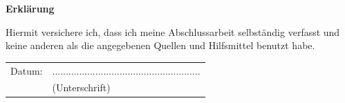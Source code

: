 \documentclass[12pt,a4paper,bibliography=totocnumbered,listof=totocnumbered]{scrartcl}
\begin{document}
\newpage
\thispagestyle{empty}
\begin{center}
	\vspace*{5em}
	\huge\textbf{Erklärung}\\
\end{center}
\vspace{2em}
Hiermit versichere ich, dass ich meine Abschlussarbeit selbständig verfasst und keine anderen als die angegebenen Quellen und Hilfsmittel benutzt habe.

\vspace{4em}
\begin{minipage}{\linewidth}
	\begin{tabular}{p{15em}p{15em}}
		Datum: &  .......................................................\\
		& \centering (Unterschrift)\\
	\end{tabular}
\end{minipage}
\end{document}
